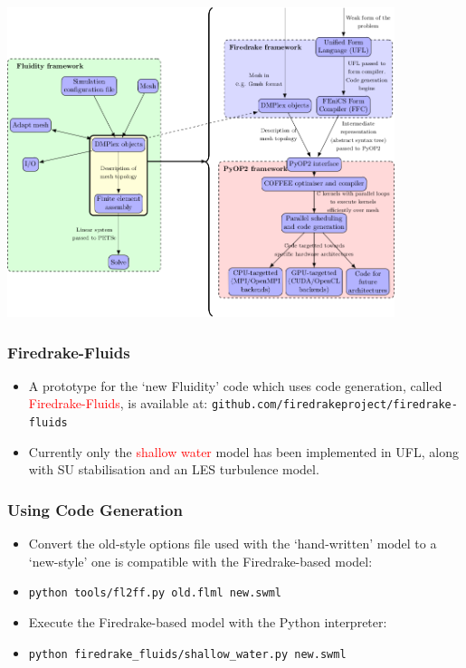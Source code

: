 \documentclass[12pt]{beamer}
\begin{document}
\begin{frame}
    \frametitle{}
\begin{center} 
\includegraphics[width=0.85\textwidth]{images/assembly_replacement.png} 
\end{center}
\end{frame}

\begin{frame}
    \frametitle{Firedrake-Fluids}
\begin{itemize}
    \item A prototype for the `new Fluidity' code which uses code generation, called \textcolor{red}{Firedrake-Fluids}, is available at: \texttt{github.com/firedrakeproject/firedrake-fluids}
    \item Currently only the \textcolor{red}{shallow water} model has been implemented in UFL, along with SU stabilisation and an LES turbulence model.
\end{itemize}
\end{frame}

\begin{frame}
    \frametitle{Using Code Generation}
\begin{itemize}
    \item Convert the old-style options file used with the `hand-written' model to a `new-style' one is compatible with the Firedrake-based model:
    \item \texttt{python tools/fl2ff.py old.flml new.swml}
    \item Execute the Firedrake-based model with the Python interpreter:
    \item \texttt{python firedrake\_fluids/shallow\_water.py new.swml}
\end{itemize}
\end{frame}
\end{document}
